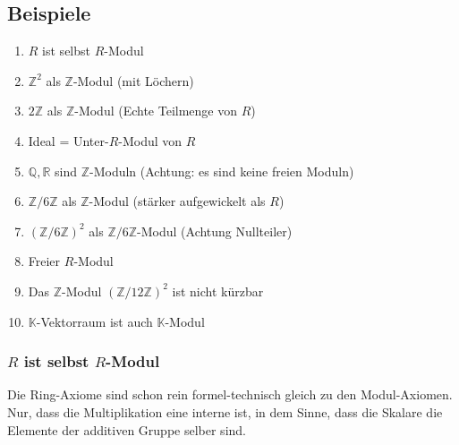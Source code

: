 \documentclass[a4paper]{amsart}
\theoremstyle{definition}
\newcommand{\R}{\ensuremath{\mathbb{ R }}}
\newcommand{\Q}{\ensuremath{\mathbb{ Q }}}
\newcommand{\Z}{\ensuremath{\mathbb{ Z }}}
\newcommand{\K}{\ensuremath{\mathbb{ K }}}
\newcommand{\zz}[1]{\ensuremath{\Z /#1\Z}}
\begin{document}
\subsection{Beispiele}
\begin{enumerate}
   \item $R$ ist selbst $R$-Modul
   \item $\Z^2$ als \Z-Modul (mit Löchern)
   \item $2\Z$ als \Z-Modul (Echte Teilmenge von $R$)
   \item Ideal = Unter-$R$-Modul von $R$
   \item $\Q, \R$ sind $\Z$-Moduln (Achtung: es sind keine freien Moduln)
   \item \zz6 als \Z-Modul (stärker aufgewickelt als $R$)
   \item $(\zz6)^2$ als \zz6-Modul (Achtung Nullteiler)
   \item Freier $R$-Modul
   \item Das \Z-Modul $(\zz{12})^2$ ist nicht kürzbar
   \item $\K$-Vektorraum ist auch $\K$-Modul
\end{enumerate}

\subsubsection{$R$ ist selbst $R$-Modul}
Die Ring-Axiome sind schon rein formel-technisch gleich zu den Modul-Axiomen. Nur, dass die Multiplikation eine interne ist, in dem Sinne, dass die Skalare die Elemente der additiven Gruppe selber sind.

\end{document}
